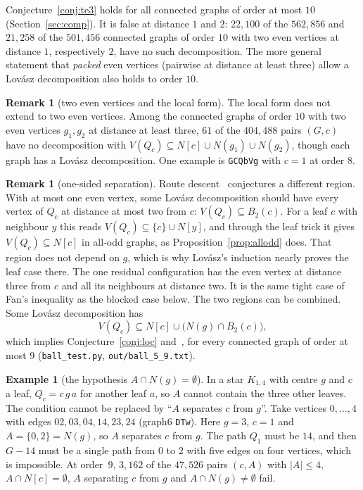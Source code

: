 \documentclass[11pt]{amsart}
\theoremstyle{definition}
\newtheorem{remark}[theorem]{Remark}
\newtheorem{example}[theorem]{Example}
\begin{document}
Conjecture~\ref{conj:te3} holds for all connected graphs of order at most $10$
(Section~\ref{sec:comp}). It is false at distance $1$ and $2$: $22{,}100$ of the $562{,}856$ and
$21{,}258$ of the $501{,}456$ connected graphs of order $10$ with two even vertices at distance $1$,
respectively $2$, have no such decomposition. The more general statement that \emph{packed} even vertices (pairwise at distance at
least three) allow a Lov\'asz decomposition also holds to order $10$.

\begin{remark}[two even vertices and the local form]\label{rem:pe}
The local form does not extend to two even vertices. Among the connected graphs of order $10$ with two
even vertices $g_1,g_2$ at distance at least three, $61$ of the $404{,}488$ pairs $(G,c)$ have no
decomposition with $V(Q_c)\subseteq N[c]\cup N(g_1)\cup N(g_2)$, though each graph has a Lov\'asz
decomposition. One example is \texttt{GCQbVg} with $c=1$ at order $8$.
\end{remark}

\begin{remark}[one-sided separation]\label{rem:ball}
Route descent~\cite[Conjecture~8.2]{RD} conjectures a different region. With at most one even vertex,
some Lov\'asz decomposition should have every vertex of $Q_c$ at distance at most two from $c$:
$V(Q_c)\subseteq B_2(c)$. For a leaf $c$ with neighbour $y$ this reads $V(Q_c)\subseteq\{c\}\cup N[y]$,
and through the leaf trick it gives $V(Q_c)\subseteq N[c]$ in all-odd graphs, as
Proposition~\ref{prop:allodd} does. That region does not depend on $g$, which is why Lov\'asz's
induction nearly proves the leaf case there. The one residual configuration has the even vertex at
distance three from $c$ and all its neighbours at distance two. It is the same tight case of Fan's
inequality as the blocked case below. The two regions can be combined. Some Lov\'asz decomposition has
\[V(Q_c)\subseteq N[c]\cup\bigl(N(g)\cap B_2(c)\bigr),\]
which implies Conjecture~\ref{conj:loc} and~\cite[Conjecture~8.2]{RD}, for every connected graph of
order at most $9$ (\texttt{ball\_test.py}, \texttt{out/ball\_5\_9.txt}).
\end{remark}

\begin{example}[the hypothesis $A\cap N(g)=\emptyset$]\label{ex:sep}
In a star $K_{1,4}$ with centre $g$ and $c$ a leaf, $Q_c=c\,g\,a$ for another leaf $a$, so $A$ cannot
contain the three other leaves. The condition cannot be replaced by ``$A$ separates $c$ from $g$''.
Take vertices $0,\dots,4$ with edges $02,03,04,14,23,24$ (graph6 \texttt{DTw}). Here $g=3$, $c=1$ and
$A=\{0,2\}=N(g)$, so $A$ separates $c$ from $g$. The path $Q_1$ must be $14$, and then $G-14$ must be a
single path from $0$ to $2$ with five edges on four vertices, which is impossible. At order~$9$,
$3{,}162$ of the $47{,}526$ pairs $(c,A)$ with $|A|\le4$, $A\cap N[c]=\emptyset$, $A$ separating $c$
from $g$ and $A\cap N(g)\neq\emptyset$ fail.
\end{example}
\end{document}
